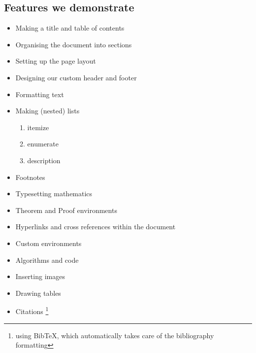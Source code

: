 \documentclass[10pt, A4]{article}
\newcommand*{\daggerfootnote}[1]{%
	\setcounter{daggerfootnote}{\value{footnote}}%
	\renewcommand*{\thefootnote}{\fnsymbol{footnote}}%
	\footnote[2]{#1}%
	\setcounter{footnote}{\value{daggerfootnote}}%
	\renewcommand*{\thefootnote}{\arabic{footnote}}%
}
\newcounter{code}[section]
\begin{document}
\subsection*{Features we demonstrate}
\begin{itemize}
	\item Making a title and table of contents
	\vspace{-0.3em}
	\item Organising the document into sections
	\vspace{-0.3em}
	\item Setting up the page layout
	\vspace{-0.3em}
	\item Designing our custom header and footer
	\vspace{-0.3em}
	\item Formatting text
	\vspace{-0.3em}
	\item Making (nested) lists
	\vspace{-0.3em}
	\begin{enumerate}
		\item itemize
		\vspace{-0.3em}
		\item enumerate
		\vspace{-0.3em}
		\item description
		\vspace{-0.3em}
	\end{enumerate}
	\item Footnotes
	\vspace{-0.3em}
	\item Typesetting mathematics
	\vspace{-0.3em}
	\item Theorem and Proof environments
	\vspace{-0.3em}
	\item Hyperlinks and cross references within the document
	\vspace{-0.3em}
	\item Custom environments
	\vspace{-0.3em}
	\item Algorithms and code
	\vspace{-0.3em}
	\item Inserting images
	\vspace{-0.3em}
	\item Drawing tables
	\vspace{-0.3em}
	\item Citations\daggerfootnote{using BibTeX, which automatically takes care of the bibliography formatting}
\end{itemize}
\end{document}
